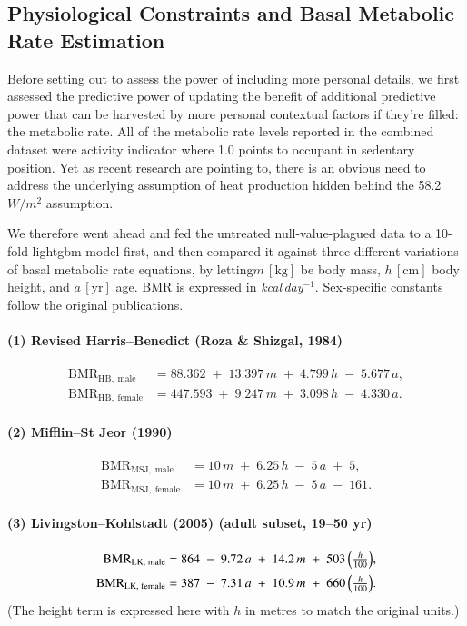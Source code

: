 \subsection{Physiological Constraints and Basal Metabolic Rate Estimation}\label{sec:Physiological_Constraints}
Before setting out to assess the power of including more personal details, we first assessed the predictive power of updating the benefit of additional predictive power that can be harvested by more personal contextual factors if they're filled: the metabolic rate.  All of the metabolic rate levels reported in the combined dataset were activity indicator where 1.0 points to occupant in sedentary position. Yet as recent research are pointing to, there is an obvious need to address the underlying assumption of heat production hidden behind the 58.2$W/m^2$ assumption. 

We therefore went ahead and fed the untreated null-value-plagued data to a 10-fold lightgbm model first, and then compared it against three different variations of basal metabolic rate equations, by letting\(
m\,[\text{kg}]
\) be body mass,
\(
h\,[\text{cm}]
\) body height, and
\(
a\,[\text{yr}]
\) age.  
BMR is expressed in \emph{kcal\,day$^{-1}$}.  
Sex‐specific constants follow the original publications.

\paragraph{(1) Revised Harris–Benedict (Roza \& Shizgal, 1984\cite{Roza1984})}
\begin{align}
\mathrm{BMR}_{\mathrm{HB},\;\text{male}}   &= 88.362 \;+\; 13.397\,m \;+\; 4.799\,h \;-\; 5.677\,a, \\\label{eq:firstbmr}
\mathrm{BMR}_{\mathrm{HB},\;\text{female}} &= 447.593 \;+\; 9.247\,m \;+\; 3.098\,h \;-\; 4.330\,a.
\end{align}

\paragraph{(2) Mifflin–St Jeor (1990)\cite{Mifflin1990}}
\begin{align}
\mathrm{BMR}_{\mathrm{MSJ},\;\text{male}}   &= 10\,m \;+\; 6.25\,h \;-\; 5\,a \;+\; 5, \\
\mathrm{BMR}_{\mathrm{MSJ},\;\text{female}} &= 10\,m \;+\; 6.25\,h \;-\; 5\,a \;-\; 161.
\end{align}

\paragraph{(3) Livingston–Kohlstadt (2005) \textnormal{(adult subset, 19–50 yr)}\cite{Livingston2005}}
\begin{align}
\mathrm{BMR}_{\mathrm{LK},\;\text{male}}   &= 864 \;-\; 9.72\,a \;+\; 14.2\,m \;+\; 503\,\Bigl(\tfrac{h}{100}\Bigr),\\
\mathrm{BMR}_{\mathrm{LK},\;\text{female}} &= 387 \;-\; 7.31\,a \;+\; 10.9\,m \;+\; 660\,\Bigl(\tfrac{h}{100}\Bigr).
\end{align}
(The height term is expressed here with \(h\) in metres to match the original units.)


